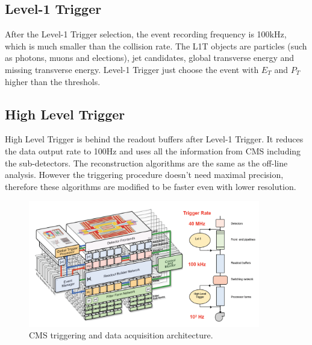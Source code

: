 \subsection*{Level-1 Trigger}
After the Level-1 Trigger selection, the event recording frequency is 100kHz\cite{L1T}, which is much smaller than the collision rate. The L1T objects are particles (such as photons, muons and elections), jet candidates, global transverse energy and missing transverse energy. Level-1 Trigger just choose the event with $E_{T}$ and $P_{T}$ higher than the threshols.

\subsection*{High Level Trigger}
High Level Trigger is behind the readout buffers after Level-1 Trigger. It reduces the data output rate to 100Hz and uses all the information from CMS including the sub-detectors. The reconstruction algorithms are the same as the off-line analysis. However the triggering procedure doesn't need maximal precision, therefore these algorithms are modified to be faster even with lower resolution.

\begin{figure}[hbtp]
  \begin{center}
    \includegraphics[width=0.9\textwidth]{figure/CH2/trigger.png}
  \end{center}
  \caption{\label{fig:trigger}CMS triggering and data acquisition architecture.}
\end{figure}
